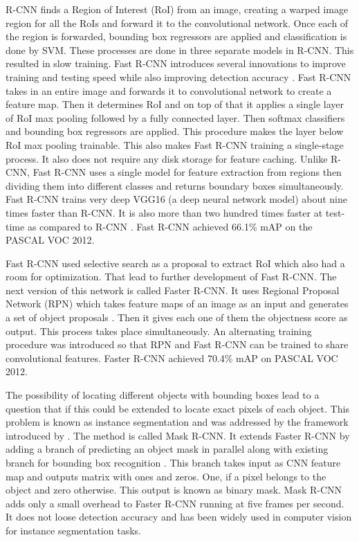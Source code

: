 \documentclass[11pt]{article}
\begin{document}
R-CNN finds a Region of Interest (RoI) from an image, creating a warped image region for all the RoIs and forward it to the convolutional network. Once each of the region is forwarded, bounding box regressors are applied and classification is done by SVM. These processes are done in three separate models in R-CNN. This resulted in slow training. Fast R-CNN introduces several innovations to improve training and testing speed while also improving detection accuracy \cite{girshick2015fast}. Fast R-CNN takes in an entire image and forwards it to convolutional network to create a feature map. Then it determines RoI and on top of that it applies a single layer of RoI max pooling followed by a fully connected layer. Then softmax classifiers and bounding box regressors are applied. This procedure makes the layer below RoI max pooling trainable. This also makes Fast R-CNN training a single-stage process. It also does not require any disk storage for feature caching. Unlike R-CNN, Fast R-CNN uses a single model for feature extraction from regions then dividing them into different classes and returns boundary boxes simultaneously. Fast R-CNN trains very deep VGG16 (a deep neural network model) about nine times faster than R-CNN. It is also more than two hundred times faster at test-time as compared to R-CNN \cite{girshick2015fast}. Fast R-CNN achieved 66.1\% mAP on the PASCAL VOC 2012.

Fast R-CNN used selective search as a proposal to extract RoI which also had a room for optimization. That lead to further development of Fast R-CNN. The next version of this network is called Faster R-CNN. It uses Regional Proposal Network (RPN) which takes feature maps of an image as an input and generates a set of object proposals \cite{ren2015faster}. Then it gives each one of them the objectness score as output. This process takes place simultaneously. An alternating training procedure was introduced so that RPN and Fast R-CNN can be trained to share convolutional features. Faster R-CNN achieved 70.4\% mAP on PASCAL VOC 2012.

The possibility of locating different objects with bounding boxes lead to a question that if this could be extended to locate exact pixels of each object. This problem is known as instance segmentation and was addressed by the framework introduced by \cite{he_mask_2017}. The method is called Mask R-CNN. It extends Faster R-CNN by adding a branch of predicting an object mask in parallel along with existing branch for bounding box recognition \cite{he_mask_2017}. This branch takes input as CNN feature map and outputs matrix with ones and zeros. One, if a pixel belongs to the object and zero otherwise. This output is known as binary mask. Mask R-CNN adds only a small overhead to Faster R-CNN running at five frames per second. It does not loose detection accuracy and has been widely used in computer vision for instance segmentation tasks.
\end{document}
